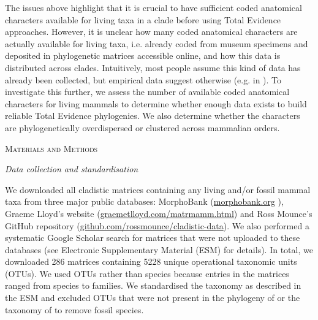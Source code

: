 \documentclass[12pt,letterpaper]{article}
\renewcommand{\section}[1]{%
\bigskip
\begin{center}
\begin{Large}
\normalfont\scshape #1
\medskip
\end{Large}
\end{center}}
\renewcommand{\subsection}[1]{%
\bigskip
\begin{center}
\begin{large}
\normalfont\itshape #1
\end{large}
\end{center}}
\begin{document}
The issues above highlight that it is crucial to have sufficient coded anatomical characters available for living taxa in a clade before using Total Evidence approaches.
However, it is unclear how many coded anatomical characters are actually available for living taxa, i.e. already coded from museum specimens and deposited in phylogenetic matrices accessible online, and how this data is distributed across clades. %
Intuitively, most people assume this kind of data has already been collected, but empirical data suggest otherwise (e.g. in \cite{ronquista2012,slaterphylogenetic2013,beckancient2014}).
To investigate this further, we assess the number of available coded anatomical characters for living mammals to determine whether enough data exists to build reliable Total Evidence phylogenies.
We also determine whether the characters are phylogenetically overdispersed or clustered across mammalian orders.

%
%
\section{Materials and Methods}
\subsection{Data collection and standardisation}
We downloaded all cladistic matrices %
 containing any living and/or fossil mammal taxa from three major public databases: MorphoBank (\url{morphobank.org} \cite{morphobank}), Graeme Lloyd's website (\url{graemetlloyd.com/matrmamm.html}) and Ross Mounce's GitHub repository (\url{github.com/rossmounce/cladistic-data}).
We also performed a systematic Google Scholar search for matrices that were not uploaded to these databases (see Electronic Supplementary Material (ESM) for details).
In total, we downloaded 286 matrices containing 5228 unique operational taxonomic units (OTUs). 
We used OTUs rather than species because entries in the matrices ranged from species to families. 
We standardised the taxonomy as described in the ESM and excluded OTUs that were not present in the phylogeny of \cite{BinindaEmonds} or the taxonomy of \cite{wilson2005mammal} to remove fossil species.
\end{document}
